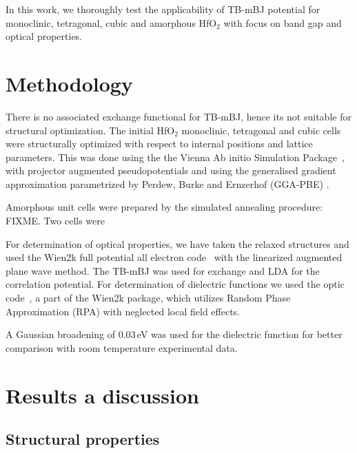 \documentclass[10pt,a4paper,twocolumn]{article}
\begin{document}

In this work, we thoroughly test the applicability of TB-mBJ potential for monoclinic, tetragonal, cubic and amorphous HfO$_2$ with focus on band gap and optical properties.

\section{Methodology}

There is no associated exchange functional for TB-mBJ, hence its not suitable for structural optimization.
The initial HfO$_2$ monoclinic, tetragonal and cubic cells were structurally optimized with respect to internal positions and lattice parameters. 
This was done using the the Vienna Ab initio Simulation Package~\cite{Kresse1996}, with projector augmented pseudopotentials \cite{Kresse1999} and using the generalised gradient approximation parametrized by Perdew, Burke and Ernzerhof (GGA-PBE) \cite{Perdew1996}. 

Amorphous unit cells were prepared by the simulated annealing procedure: FIXME. Two cells were 

For determination of optical properties, we have taken the relaxed structures and used the Wien2k full potential all electron code~\cite{Blaha2001} with the linearized augmented plane wave method. The TB-mBJ was used for exchange and LDA for the correlation potential. For determination of dielectric functions we used the optic code~\cite{AmbroschDraxl2006}, a part of the Wien2k package, which utilizes Random Phase Approximation (RPA) with neglected local field effects.

A Gaussian broadening of 0.03\,eV was used for the dielectric function for better comparison with room temperature experimental data.

\section{Results a discussion}

\subsection{Structural properties}
\end{document}
